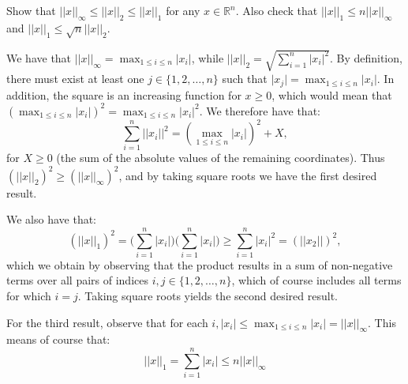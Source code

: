 \begin{exercise}{18}
    Show that $\lvert \lvert x \rvert \rvert_{\infty} \leq \lvert \lvert x \rvert \rvert_2 \leq \lvert \lvert x \rvert \rvert_1$ for any $x \in \mathbb{R}^n$.
    Also check that $\lvert \lvert x \rvert \rvert_1 \leq n \lvert \lvert x \rvert \rvert_{\infty}$ and $\lvert \lvert x \rvert \rvert_1 \leq \sqrt{n} \lvert \lvert x \rvert \rvert_2$.
\end{exercise}

\begin{solution}
    
    We have that $\lvert \lvert x \rvert \rvert_{\infty} = \max_{1 \leq i \leq n} \lvert x_i \rvert$, while $\lvert \lvert x \rvert \rvert_2 = \sqrt{\sum_{i=1}^{n} \lvert x_i \rvert^2}$.
    By definition, there must exist at least one $j \in \{1, 2, \ldots, n\}$ such that $\lvert x_j \rvert = \max_{1 \leq i \leq n} \lvert x_i \rvert$.
    In addition, the square is an increasing function for $x \geq 0$, which would mean that $(\max_{1 \leq i \leq n} \lvert x_i \rvert)^2 = \max_{1 \leq i \leq n} \lvert x_i \rvert^2$.
    We therefore have that:
    $$\sum_{i=1}^{n} \lvert \lvert x_i \rvert \rvert^2 = (\max_{1 \leq i \leq n} \lvert x_i \rvert)^2 + X,$$
    for $X \geq 0$ (the sum of the absolute values of the remaining coordinates).
    Thus $(\lvert \lvert x \rvert \rvert_2)^2 \geq (\lvert \lvert x \rvert \rvert_{\infty})^2$, and by taking square roots we have the first desired result.
    
    We also have that:
    $$(\lvert \lvert x \rvert \rvert_1)^2 = \Biggl(\sum_{i=1}^{n} \lvert x_i \rvert\Biggr)\Biggl(\sum_{i=1}^{n} \lvert x_i \rvert\Biggr) \geq \sum_{i=1}^{n} \lvert x_i \rvert^2 = (\lvert \lvert x_2 \rvert \rvert)^2,$$
    which we obtain by observing that the product results in a sum of non-negative terms over all pairs of indices $i, j \in \{1, 2, \ldots, n\}$, which of course includes all terms for which $i = j$.
    Taking square roots yields the second desired result.

    For the third result, observe that for each $i, \lvert x_i \rvert \leq \max_{1 \leq i \leq n} \lvert x_i \rvert = \lvert \lvert x \rvert \rvert_{\infty}$.
    This means of course that:
    $$\lvert \lvert x \rvert \rvert_1 = \sum_{i=1}^{n} \lvert x_i \rvert \leq n \lvert \lvert x \rvert \rvert_{\infty}$$
    

\end{solution}
